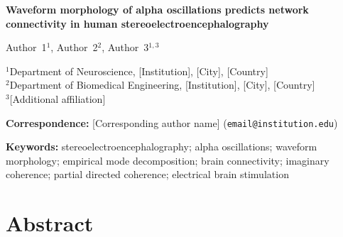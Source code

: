 \documentclass[11pt, a4paper]{article}
\begin{document}
\begin{titlepage}
\vspace*{2cm}
{\LARGE\bfseries
Waveform morphology of alpha oscillations predicts network
connectivity in human stereoelectroencephalography
\par}

\vspace{1.5cm}
{\large
Author~1$^{1}$,
Author~2$^{2}$,
Author~3$^{1,3}$
\par}

\vspace{0.5cm}
{\normalsize
$^{1}$Department of Neuroscience, [Institution], [City], [Country]\\
$^{2}$Department of Biomedical Engineering, [Institution], [City], [Country]\\
$^{3}$[Additional affiliation]
\par}

\vspace{1.5cm}
{\small\noindent
\textbf{Correspondence:} [Corresponding author name] (\texttt{email@institution.edu})
\par}

\vspace{1cm}
{\small\noindent
\textbf{Keywords:}
stereoelectroencephalography; alpha oscillations; waveform morphology;
empirical mode decomposition; brain connectivity; imaginary coherence;
partial directed coherence; electrical brain stimulation
\par}
\end{titlepage}

\newpage
\section*{Abstract}
\end{document}
